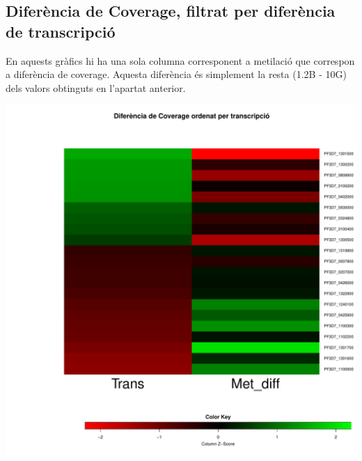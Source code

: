 \documentclass{article}\usepackage[]{graphicx}\usepackage[]{color}
\newenvironment{knitrout}{}{} %
\begin{document}

\subsection{Diferència de Coverage, filtrat per diferència de transcripció}
En aquests gràfics hi ha una sola columna corresponent a metilació que correspon a diferència de coverage. Aquesta diferència és simplement la resta (1.2B - 10G) dels valors obtinguts en l'apartat anterior.
\begin{knitrout}
\color{fgcolor}

{\centering \includegraphics[width=.9\linewidth]{figure/minimal-_heat_cov_diff-1} 

}



\end{knitrout}
\clearpage
\end{document}
